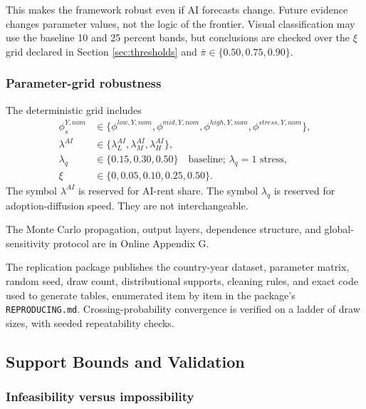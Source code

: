 \documentclass[11pt,a4paper]{article}
\begin{document}
This makes the framework robust even if AI forecasts change. Future evidence changes parameter values, not the logic of the frontier. Visual classification may use the baseline 10 and 25 percent bands, but conclusions are checked over the $\xi$ grid declared in Section \ref{sec:thresholds} and $\bar{\pi}\in\{0.50,0.75,0.90\}$.

\subsubsection{Parameter-grid robustness}

The deterministic grid includes
\begin{align}
    \phi^{Y,nom}_s &\in \{\phi^{low,Y,nom},\phi^{mid,Y,nom},\phi^{high,Y,nom},\phi^{stress,Y,nom}\},\\
    \lambda^{AI} &\in \{\lambda^{AI}_L,\lambda^{AI}_M,\lambda^{AI}_H\},\\
    \lambda_q &\in \{0.15,0.30,0.50\}\quad\text{baseline; }\lambda_q=1\text{ stress},\\
    \xi &\in \{0,0.05,0.10,0.25,0.50\}.
\end{align}
The symbol $\lambda^{AI}$ is reserved for AI-rent share. The symbol $\lambda_q$ is reserved for adoption-diffusion speed. They are not interchangeable.

\label{sec:robustness}

The Monte Carlo propagation, output layers, dependence structure, and global-sensitivity protocol are in Online Appendix G.

The replication package publishes the country-year dataset, parameter matrix, random seed, draw count, distributional supports, cleaning rules, and exact code used to generate tables, enumerated item by item in the package's \texttt{REPRODUCING.md}. Crossing-probability convergence is verified on a ladder of draw sizes, with seeded repeatability checks.



\subsection{Support Bounds and Validation}\label{sec:impossibility_falsification}

\subsubsection{Infeasibility versus impossibility}\label{subsec:infeasibility_impossibility}
\end{document}
